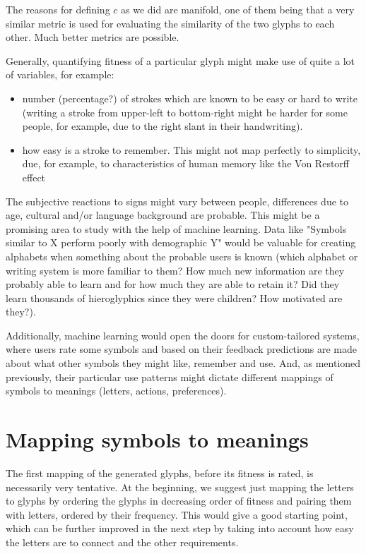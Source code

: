 \documentclass{vgtc}                          %
\begin{document}
The reasons for defining \(c\) as we did are manifold, one of them being that a very similar metric is used for evaluating the similarity of the two glyphs to each other. Much better metrics are possible.

Generally, quantifying fitness of a particular glyph might make use of quite a lot of variables, for example:
\begin{itemize}
        \item number (percentage?) of strokes which are known to be easy or hard to write (writing a stroke from upper-left to bottom-right might be harder for some people, for example, due to the right slant in their handwriting). 
        \item how easy is a stroke to remember. This might not map perfectly to simplicity, due, for example, to characteristics of human memory like the Von Restorff effect~\cite{hunt1995subtlety}
\end{itemize}
	The subjective reactions to signs might vary between people, differences due to age, cultural and/or language background are probable. This might be a promising area to study with the help of machine learning. Data like "Symbols similar to X perform poorly with demographic Y" would be valuable for creating alphabets when something about the probable users is known (which alphabet or writing system is more familiar to them? How much new information are they probably able to learn and for how much they are able to retain it? Did they learn thousands of hieroglyphics since they were children? How motivated are they?). 

Additionally, machine learning would open the doors for custom-tailored systems, where users rate some symbols and based on their feedback predictions are made about what other symbols they might like, remember and use. And, as mentioned previously, their particular use patterns might dictate different mappings of symbols to meanings (letters, actions, preferences). 
\section{Mapping symbols to meanings}
The first mapping of the generated glyphs, before its fitness is rated, is necessarily very tentative. At the beginning, we suggest just mapping the letters to glyphs by ordering the glyphs in decreasing order of fitness and pairing them with letters, ordered by their frequency. This would give a good starting point, which can be further improved in the next step by taking into account how easy the letters are to connect and the other requirements. 
\end{document}
